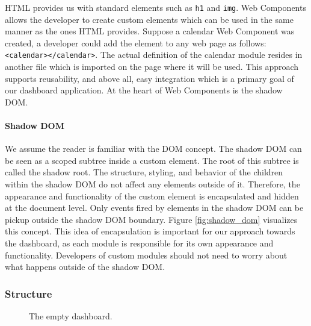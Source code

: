         HTML provides us with standard elements such as \texttt{h1} and \texttt{img}. Web Components allows the developer to create custom elements which can be used in the same manner as the ones HTML provides. Suppose a calendar Web Component was created, a developer could add the element to any web page as follows: \texttt{<calendar></calendar>}. The actual definition of the calendar module resides in another file which is imported on the page where it will be used. This approach supports reusability, and above all, easy integration which is a primary goal of our dashboard application. At the heart of Web Components is the shadow DOM.

        \paragraph{Shadow DOM} We assume the reader is familiar with the DOM concept. The shadow DOM can be seen as a scoped subtree inside a custom element. The root of this subtree is called the shadow root. The structure, styling, and behavior of the children within the shadow DOM do not affect any elements outside of it. Therefore, the appearance and functionality of the custom element is encapsulated and hidden at the document level. Only events fired by elements in the shadow DOM can be pickup outside the shadow DOM boundary. Figure \ref{fig:shadow_dom} visualizes this concept. This idea of encapsulation is important for our approach towards the dashboard, as each module is responsible for its own appearance and functionality. Developers of custom modules should not need to worry about what happens outside of the shadow DOM.

        \subsubsection{Structure} \label{dashboard_structure}

        \begin{figure}[!t]
            \centering
            \caption{The empty dashboard.}\label{fig:screen_db_empty}
        \end{figure}

